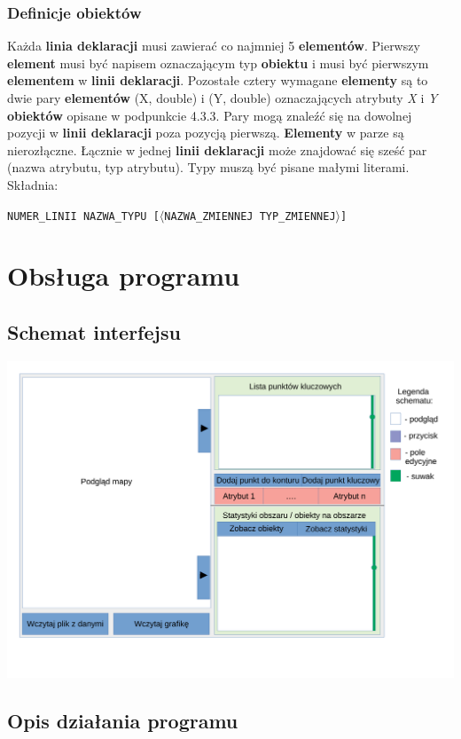 \documentclass[a4paper, 10pt, titlepage]{article}
\newcommand{\code}[1]{\texttt{#1}}
\begin{document}
\subsubsection{Definicje obiektów}
Każda \textbf{linia deklaracji} musi zawierać co najmniej 5 \textbf{elementów}. 
Pierwszy \textbf{element} musi być napisem oznaczającym typ \textbf{obiektu} i musi być pierwszym \textbf{elementem} w \textbf{linii deklaracji}.
Pozostałe cztery wymagane \textbf{elementy} są to dwie pary \textbf{elementów} (X, double) i (Y, double) oznaczających atrybuty \textit{X} i \textit{Y} \textbf{obiektów} opisane w podpunkcie 4.3.3. Pary mogą znaleźć się na dowolnej pozycji w \textbf{linii deklaracji} poza pozycją pierwszą. \textbf{Elementy} w parze są nierozłączne.
Łącznie w jednej \textbf{linii deklaracji} może znajdować się sześć par (nazwa atrybutu, typ atrybutu).
Typy muszą być pisane małymi literami. Składnia:
\begin{center}
\code{NUMER\_LINII NAZWA\_TYPU [$\langle$NAZWA\_ZMIENNEJ TYP\_ZMIENNEJ$\rangle$]}
\end{center}
\section{Obsługa programu}

\subsection{Schemat interfejsu}
\includegraphics[width = \textwidth]{gui.pdf}

\subsection{Opis działania programu}
\end{document}
